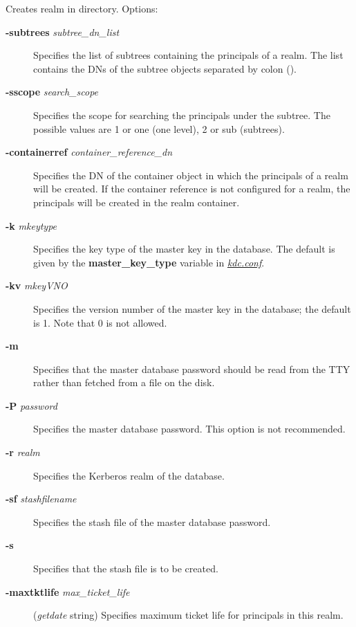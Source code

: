 \documentclass[letterpaper,10pt,english]{sphinxmanual}
\begin{document}
Creates realm in directory. Options:
\begin{description}
\item[{\textbf{-subtrees} \emph{subtree\_dn\_list}}] \leavevmode
Specifies the list of subtrees containing the principals of a
realm.  The list contains the DNs of the subtree objects separated
by colon (\code{:}).

\item[{\textbf{-sscope} \emph{search\_scope}}] \leavevmode
Specifies the scope for searching the principals under the
subtree.  The possible values are 1 or one (one level), 2 or sub
(subtrees).

\item[{\textbf{-containerref} \emph{container\_reference\_dn}}] \leavevmode
Specifies the DN of the container object in which the principals
of a realm will be created.  If the container reference is not
configured for a realm, the principals will be created in the
realm container.

\item[{\textbf{-k} \emph{mkeytype}}] \leavevmode
Specifies the key type of the master key in the database.  The
default is given by the \textbf{master\_key\_type} variable in
{\hyperref[admin/conf_files/kdc_conf:kdc-conf-5]{\emph{kdc.conf}}}.

\item[{\textbf{-kv} \emph{mkeyVNO}}] \leavevmode
Specifies the version number of the master key in the database;
the default is 1.  Note that 0 is not allowed.

\item[{\textbf{-m}}] \leavevmode
Specifies that the master database password should be read from
the TTY rather than fetched from a file on the disk.

\item[{\textbf{-P} \emph{password}}] \leavevmode
Specifies the master database password. This option is not
recommended.

\item[{\textbf{-r} \emph{realm}}] \leavevmode
Specifies the Kerberos realm of the database.

\item[{\textbf{-sf} \emph{stashfilename}}] \leavevmode
Specifies the stash file of the master database password.

\item[{\textbf{-s}}] \leavevmode
Specifies that the stash file is to be created.

\item[{\textbf{-maxtktlife} \emph{max\_ticket\_life}}] \leavevmode
(\emph{getdate} string) Specifies maximum ticket life for
principals in this realm.


\end{description}
\end{document}
